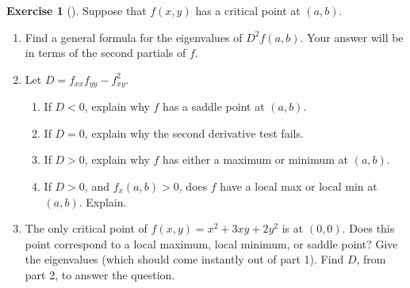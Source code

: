 \documentclass[10pt,]{book}
\theoremstyle{plain}
\theoremstyle{definition}
\theoremstyle{definition}
\theoremstyle{definition}
\theoremstyle{definition}
\newtheorem{exploration}[project]{Exercise}
\theoremstyle{definition}
\numberwithin{equation}{section}
\newcommand{\lt}{<}
\begin{document}
\begin{exploration}[]\label{exploration-238}
Suppose that \(f(x,y)\) has a critical point at \((a,b)\).%
\begin{enumerate}[font=\bfseries,label=(\alph*),ref=\alph*]
\item\label{task-651} Find a general formula for the eigenvalues of \(D^2f(a,b)\). Your answer will be in terms of the second partials of \(f\).%
\item\label{task-652} Let \(D=f_{xx}f_{yy}-f_{xy}^2\).%
\begin{enumerate}[font=\bfseries,label=(\roman*),ref=\theenumi.\roman*]
\item\label{task-653} If \(D\lt 0\), explain why \(f\) has a saddle point at \((a,b)\).%
\item\label{task-654} If \(D=0\), explain why the second derivative test fails.%
\item\label{task-655} If \(D>0\), explain why \(f\) has either a maximum or minimum at \((a,b)\).%
\item\label{task-656} If \(D>0\), and \(f_x(a,b)>0\), does \(f\) have a local max or local min at \((a,b)\). Explain.%
\end{enumerate}
\item\label{task-657} The only critical point of \(f(x,y) = x^2+3xy+2y^2\) is at \((0,0)\).  Does this point correspond to a local maximum, local minimum, or saddle point? Give the eigenvalues (which should come instantly out of part 1). Find \(D\), from part 2, to answer the question.%
\end{enumerate}
\end{exploration}
\typeout{************************************************}
\typeout{************************************************}
\end{document}
